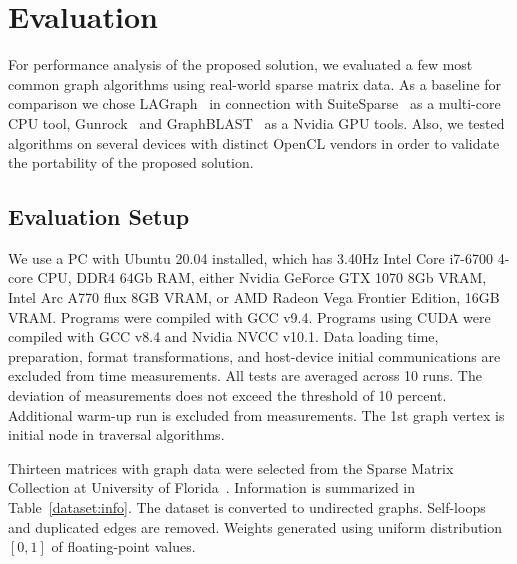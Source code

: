 \section{Evaluation}

For performance analysis of the proposed solution, we evaluated a few most common graph algorithms using real-world sparse matrix data. 
As a baseline for comparison we chose LAGraph~\cite{szarnyas2021lagraph} in connection with SuiteSparse~\cite{10.1145/3322125} as a multi-core CPU tool, Gunrock~\cite{7967137} and GraphBLAST~\cite{yang2019graphblast} as a Nvidia GPU tools. 
Also, we tested algorithms on several devices with distinct OpenCL vendors in order to validate the portability of the proposed solution. 

\subsection{Evaluation Setup}

We use a PC with Ubuntu 20.04 installed, which has 3.40Hz Intel Core i7-6700 4-core CPU, DDR4 64Gb RAM, either Nvidia GeForce GTX 1070 8Gb VRAM, Intel Arc A770 flux 8GB VRAM, or AMD Radeon Vega Frontier Edition, 16GB VRAM. Programs were compiled with GCC v9.4. Programs using CUDA were compiled with GCC v8.4 and Nvidia NVCC v10.1.
Data loading time, preparation, format transformations, and host-device initial communications are excluded from time measurements. 
All tests are averaged across 10 runs. 
The deviation of measurements does not exceed the threshold of 10 percent. 
Additional warm-up run is excluded from measurements. 
The 1st graph vertex is initial node in traversal algorithms.

Thirteen matrices with graph data were selected from the Sparse Matrix Collection at University of Florida~\cite{dataset:10.1145/2049662.2049663}. 
Information is summarized in Table~\ref{dataset:info}. 
The dataset is converted to undirected graphs. 
Self-loops and duplicated edges are removed. 
Weights generated using uniform distribution $[0, 1]$ of floating-point values.
 
